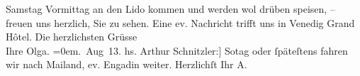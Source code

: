 \begin{ledgroupsized}[t]{13cm}
                  Samstag{ }Vormittag an den Lido kommen und
               werden wol drüben speisen, – freuen uns herzlich, Sie zu sehen. Eine ev. Nachricht
               trifft uns in Venedig Grand Hôtel.\pend
           \pstart
           Die herzlichsten Grüsse{\\[\baselineskip]}Ihre \spacefill\mbox{Olga.}\pend
           \leftskip=0em{}. Aug 13.\pend
           \pstart
           \noindent{}{\pb}{[}hs. Arthur Schnitzler:{]} So{\geminationn}tag oder ſpäteſtens \label{KLL02149_Beer-Hofmann-Beer-HofmannP-2v}\label{KLL02149_Beer-Hofmann-Beer-HofmannP-2h} fahren wir nach Mailand, ev. Engadin weiter.\pend
           \pstart Herzlichſt Ihr \spacefill\mbox{A.}\pend{}
         
         \endnumbering{}\end{ledgroupsized}  \newcommand{\dateiname}{L02149}\newcommand{\titel}{Olga und Arthur Schnitzler an Richard und Paula Beer-Hofmann, 20. 8. 1913}\newcommand{\editorInnen}{Martin Anton Müller und Gerd-Hermann Susen}
      
